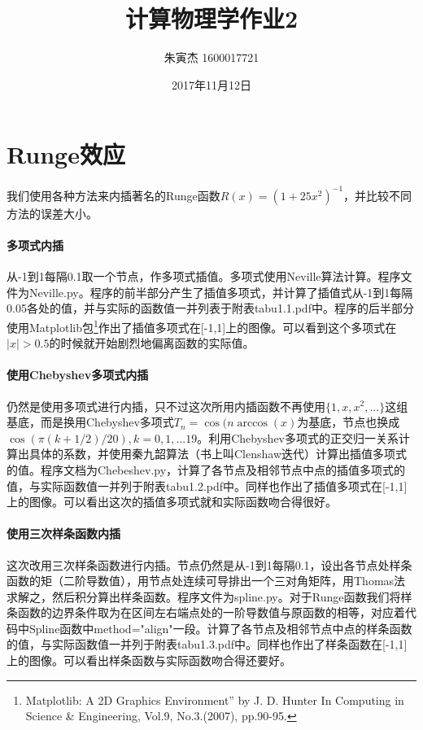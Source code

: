 \documentclass[UTF8]{ctexart}
\title{计算物理学作业2}
\author{朱寅杰 1600017721}
\date{2017年11月12日}
\begin{document}
\maketitle

\section{Runge效应}
我们使用各种方法来内插著名的Runge函数$R(x)=(1+25x^2)^{-1}$，并比较不同方法的误差大小。
\paragraph{多项式内插}
从-1到1每隔0.1取一个节点，作多项式插值。多项式使用Neville算法计算。程序文件为Neville.py。程序的前半部分产生了插值多项式，并计算了插值式从-1到1每隔0.05各处的值，并与实际的函数值一并列表于附表tabu1.1.pdf中。程序的后半部分使用Matplotlib包\footnote{Matplotlib: A 2D Graphics Environment” by J. D. Hunter In Computing in Science \& Engineering, Vol.9, No.3.(2007), pp.90-95.}作出了插值多项式在[-1,1]上的图像。可以看到这个多项式在$\lvert x \rvert >0.5$的时候就开始剧烈地偏离函数的实际值。

\paragraph{使用Chebyshev多项式内插}
仍然是使用多项式进行内插，只不过这次所用内插函数不再使用$\{1,x,x^2,...\}$这组基底，而是换用Chebyshev多项式$T_n=\cos(n\arccos(x)$为基底，节点也换成$\cos(\pi(k+1/2)/20),k=0,1,...19$。利用Chebyshev多项式的正交归一关系计算出具体的系数，并使用秦九韶算法（书上叫Clenshaw迭代）计算出插值多项式的值。程序文档为Chebeshev.py，计算了各节点及相邻节点中点的插值多项式的值，与实际函数值一并列于附表tabu1.2.pdf中。同样也作出了插值多项式在[-1,1]上的图像。可以看出这次的插值多项式就和实际函数吻合得很好。

\paragraph{使用三次样条函数内插}
这次改用三次样条函数进行内插。节点仍然是从-1到1每隔0.1，设出各节点处样条函数的矩（二阶导数值），用节点处连续可导排出一个三对角矩阵，用Thomas法求解之，然后积分算出样条函数。程序文件为spline.py。对于Runge函数我们将样条函数的边界条件取为在区间左右端点处的一阶导数值与原函数的相等，对应着代码中Spline函数中method="align"一段。计算了各节点及相邻节点中点的样条函数的值，与实际函数值一并列于附表tabu1.3.pdf中。同样也作出了样条函数在[-1,1]上的图像。可以看出样条函数与实际函数吻合得还要好。
\end{document}

